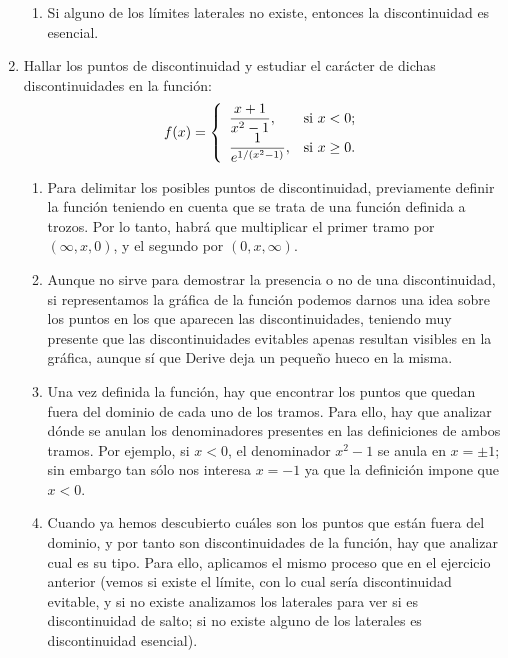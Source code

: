 \begin{enumerate}[leftmargin=*]
\begin{indicacion}
{\begin{enumerate}
\item Si alguno de los límites laterales no existe, entonces la
discontinuidad es esencial.

\end{enumerate}

}
\end{indicacion}


\item  Hallar los puntos de discontinuidad y estudiar el carácter
de dichas discontinuidades en la función:
\[
f(x)=
\left\{%
\begin{array}{ll}
    \dfrac{x+1}{x^2-1}, & \hbox{si $x<0$;} \\
    \dfrac{1}{e^{1/(x^2-1)}}, & \hbox{si $x\geq 0$.} \\
\end{array}%
\right.
\]


\begin{indicacion}
{
\begin{enumerate}

\item Para delimitar los posibles puntos de discontinuidad, previamente
definir la función teniendo en cuenta que se trata de una función
definida a trozos. Por lo tanto, habrá que multiplicar el primer
tramo por $(\infty,x,0)$, y el segundo por
$(0,x,\infty)$.

\item Aunque no sirve para demostrar la presencia o no de una discontinuidad,
si representamos la gráfica de la función podemos darnos una idea
sobre los puntos en los que aparecen las discontinuidades, teniendo
muy presente que las discontinuidades evitables apenas resultan
visibles en la gráfica, aunque sí que Derive deja un pequeño hueco
en la misma.

\item Una vez definida la función, hay que encontrar los puntos que
quedan fuera del dominio de cada uno de los tramos. Para ello, hay
que analizar dónde se anulan los denominadores presentes en las
definiciones de ambos tramos. Por ejemplo, si $x<0$, el denominador
$x^2-1$ se anula en $x=\pm1$; sin embargo tan sólo nos interesa
$x=-1$ ya que la definición impone que $x<0$.

\item Cuando ya hemos descubierto cuáles son los puntos que están
fuera del dominio, y por tanto son discontinuidades de la función,
hay que analizar cual es su tipo. Para ello, aplicamos el mismo
proceso que en el ejercicio anterior (vemos si existe el límite, con
lo cual sería discontinuidad evitable, y si no existe analizamos los
laterales para ver si es discontinuidad de salto; si no existe
alguno de los laterales es discontinuidad esencial).


\end{enumerate}}
\end{indicacion}
\end{enumerate}

